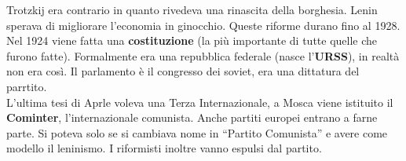 Trotzkij era contrario in quanto rivedeva una rinascita della borghesia. Lenin sperava di migliorare
l'economia in ginocchio. Queste riforme durano fino al 1928.\\ [\baselineskip]
Nel 1924 viene fatta una \textbf{costituzione} (la più importante di tutte quelle che furono fatte).
Formalmente era una repubblica federale (nasce l'\textbf{URSS}), in realtà non era così. Il 
parlamento è il congresso dei soviet, era una dittatura del parrtito.\\
L'ultima tesi di Aprle voleva una Terza Internazionale, a Mosca viene istituito il \textbf{Cominter},
l'internazionale comunista. Anche partiti europei entrano a farne parte. Si poteva solo se si 
cambiava nome in ``Partito Comunista'' e avere come modello il leninismo. I riformisti inoltre
vanno espulsi dal partito.

